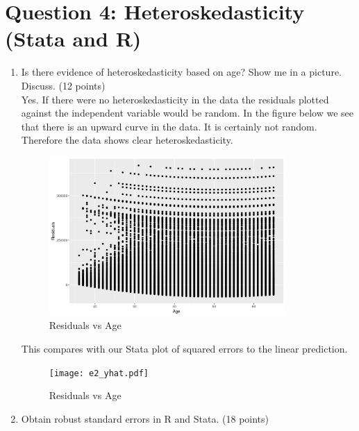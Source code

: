 \documentclass{article}
\begin{document}
\begin{enumerate}[label=\alph*]
\begin{table}[tbp]
\begin{tabularx}{\textwidth}{lCCCC}
	\end{tabularx}
\end{table}



\end{enumerate}

\section{Question 4:  Heteroskedasticity (Stata and R)}

\begin{enumerate}[label=\alph*]

\item Is there evidence of heteroskedasticity based on age? Show me in a picture.
Discuss. (12 points)\\




Yes.  If there were no heteroskedasticity in the data the residuals plotted against the independent variable would be random.  In the figure below we see that there is an upward curve in the data.  It is certainly not random.  Therefore the data shows clear heteroskedasticity.


\begin{figure}[ht!]
\centering
\includegraphics[width=90mm]{residuals.png}
\caption{Residuals vs Age \label{overflow}}
\end{figure}

This compares with our Stata plot of squared errors to the linear prediction.\\

\begin{figure}[ht!]
	\centering
	\texttt{[image: e2\_yhat.pdf]}
	\caption{Residuals vs Age \label{overflow}}
\end{figure}



\item Obtain robust standard errors in R and Stata. (18 points)


\end{enumerate}
\end{document}

